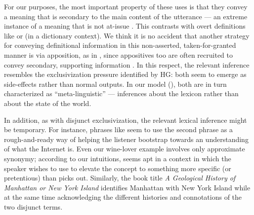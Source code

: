 \documentclass[12pt,twoside]{article}
\renewcommand{\_}{\textbf{\textunderscore\hspace{-4pt}\textunderscore\hspace{-3pt}\textunderscore\hspace{-4pt}\textunderscore}\hspace{0.5pt}}			%
\begin{document}
For our purposes, the most important property of these uses is that
they convey a meaning that is secondary to the main content of the
utterance --- an extreme instance of a meaning that is not at-issue
\citep{Tonhauser-etal:2011,Dillon-etal:2014}. This contrasts with
overt definitions like  or
 (in a dictionary context).  We think it
is no accident that another strategy for conveying definitional
information in this non-asserted, taken-for-granted manner is via
apposition, as in , since appositives
too are often recruited to convey secondary, supporting information
\citep{Potts05BOOK,Potts08HSK,Syrett-etal:2014}. In this respect, the
relevant inference resembles the exclusivization pressure identified
by HG: both seem to emerge as side-effects rather than normal
outputs. In our model (), both are in turn
characterized as ``meta-linguistic'' --- inferences about the lexicon
rather than about the state of the world.

In addition, as with disjunct exclusivization, the relevant lexical
inference might be temporary. For instance, phrases like
 seem to use the second phrase as a
rough-and-ready way of helping the listener bootstrap towards an
understanding of what the Internet is. Even our wine-lover example
involves only approximate synonymy; according to our intuitions,
 seems apt in a context in which the
speaker wishes to use  to elevate the concept to
something more specific (or pretentious) than  picks
out. Similarly, the book title \emph{A Geological History of Manhattan
  or New York Island} identifies Manhattan with New York Island while
at the same time acknowledging the different histories and
connotations of the two disjunct terms.
\end{document}
